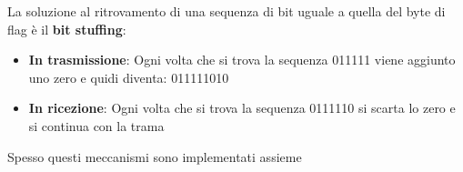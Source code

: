 \documentclass[a4paper]{article}
\begin{document}
\begin{itemize}
    \vspace{1em}
    \noindent
    La soluzione al ritrovamento di una sequenza di bit uguale a quella del byte di
    flag è il \textbf{bit stuffing}:
    \begin{itemize}
      \item \textbf{In trasmissione}: Ogni volta che si trova la sequenza 011111
        viene aggiunto uno zero e quidi diventa: 011111010

      \item \textbf{In ricezione}: Ogni volta che si trova la sequenza 0111110
        si scarta lo zero e si continua con la trama
    \end{itemize}
\end{itemize}
Spesso questi meccanismi sono implementati assieme
\end{document}
